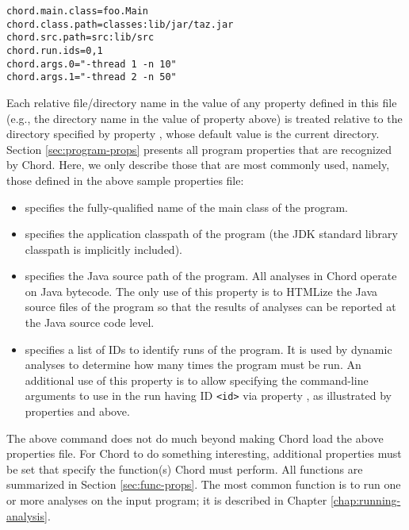 \begin{framed}
\begin{verbatim}
chord.main.class=foo.Main
chord.class.path=classes:lib/jar/taz.jar
chord.src.path=src:lib/src
chord.run.ids=0,1
chord.args.0="-thread 1 -n 10"
chord.args.1="-thread 2 -n 50"
\end{verbatim}
\end{framed}

Each relative file/directory name in the value of any property
defined in this file (e.g., the  directory name in the value of
property  above) is treated relative to the directory
specified by property , whose default value
is the current directory.
Section \ref{sec:program-props} presents all program properties that are
recognized by Chord.  Here, we only describe those that are most commonly
used, namely, those defined in the above sample properties file:

\begin{itemize}
\item
{} specifies the fully-qualified name of the main
class of the program.
\item
{} specifies the application classpath
of the program (the JDK standard library classpath is implicitly
included).
\item
{} specifies the Java source path of the program.
All analyses in Chord operate on Java bytecode.  The only use
of this property is to HTMLize the Java source files of the program so
that the results of analyses can be reported at the Java
source code level.
\item
{} specifies a list of IDs to identify runs of the
program.  It is used by dynamic analyses to determine how many
times the program must be run.  An additional use of this property is
to allow specifying the command-line arguments to use in the run
having ID {\tt <id>} via property , as
illustrated by properties  and 
above.
\end{itemize}

The above command does not do much beyond making Chord load the above
properties file.  For Chord to do something interesting,
additional properties must be set that specify the function(s)
Chord must perform.  All functions are summarized in Section \ref{sec:func-props}.
The most common function is to run one or more analyses on the input program;
it is described in Chapter \ref{chap:running-analysis}.

